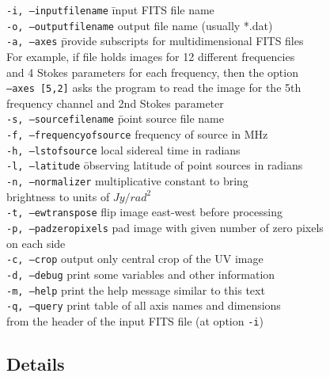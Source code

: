 \documentclass[letterpaper, twoside, 12pt]{article}
\begin{document}
\begin{tabbing}
{\tt-i, --inputfilename} \hspace{10mm} \= input FITS file name \\
{\tt-o, --outputfilename} \> output file name (usually *.dat) \\
{\tt-a, --axes} \hspace{5mm} \= provide subscripts for multidimensional FITS files \\ 
\>For example, if file holds images for 12 different frequencies \\
\>and 4 Stokes parameters for each frequency, then the option \\
\> {\tt--axes [5,2]} asks the program to read the image for the 5th \\
\> frequency channel and 2nd Stokes parameter \\
{\tt-s, --sourcefilename} \hspace{6mm} \= point source file name \\
{\tt-f, --frequencyofsource} \> frequency of source in MHz    \\
{\tt-h, --lstofsource} \> local sidereal time in radians\\
{\tt-l, --latitude} \hspace{10mm} \= observing latitude of point sources in
 radians\\
{\tt-n, --normalizer} \> multiplicative constant to bring \\
		\> brightness to units of $Jy/rad^2$ \\
{\tt-t, --ewtranspose} \> flip image east-west before processing \\
{\tt-p, --padzeropixels} \>  pad image with given number of zero pixels \\
		\> on each side \\
{\tt-c, --crop} \>  output only central crop of the UV image \\
{\tt-d, --debug} \> print some variables and other information	\\
{\tt-m, --help} \> print the help message similar to this text \\
{\tt-q, --query} \> print table of all axis names and dimensions \\
 \>from the header of the input FITS file (at option {\tt-i}) \\
\end{tabbing}

\subsection*{Details}
\end{document}

